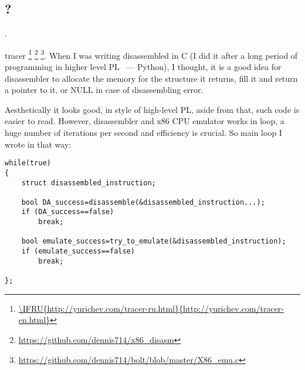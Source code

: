 ﻿\subsection{?}

.

 tracer
\footnote{\url{\IFRU{http://yurichev.com/tracer-ru.html}{http://yurichev.com/tracer-en.html}}}
\footnote{\url{https://github.com/dennis714/x86_disasm}} 
\footnote{\url{https://github.com/dennis714/bolt/blob/master/X86_emu.c}}.
{When I was writing disassembled in C (I did it after a long period of programming in higher level 
\ac{PL} ~---
Python), I thought, it is a good idea for disassembler to allocate the memory for the structure it returns,
fill it and return a pointer to it, or NULL in case of disassembling error}.

{Aesthetically it looks good, in style of high-level \ac{PL}, aside from that, such code is easier to read}.
{However, disassembler and x86 CPU emulator works in loop, a huge number of iterations per second and efficiency
is crucial}.
{So main loop I wrote in that way}:

\begin{lstlisting}
while(true)
{
	struct disassembled_instruction;

	bool DA_success=disassemble(&disassembled_instruction...);
	if (DA_success==false)
		break;

	bool emulate_success=try_to_emulate(&disassembled_instruction);
	if (emulate_success==false)
		break;

};
\end{lstlisting}

